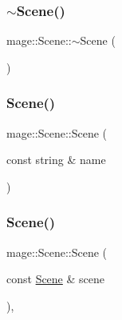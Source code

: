 \subsubsection{\texorpdfstring{$\sim$\+Scene()}{~Scene()}}
{\footnotesize\ttfamily mage\+::\+Scene\+::$\sim$\+Scene (\begin{DoxyParamCaption}{ }\end{DoxyParamCaption})\hspace{0.3cm}{\ttfamily [default]}}

\hypertarget{classmage_1_1_scene_aab61b38547fc53aa9c5b3b559f4d2e26}{}\label{classmage_1_1_scene_aab61b38547fc53aa9c5b3b559f4d2e26} 
\subsubsection{\texorpdfstring{Scene()}{Scene()}\hspace{0.1cm}{\footnotesize\ttfamily [1/3]}}
{\footnotesize\ttfamily mage\+::\+Scene\+::\+Scene (\begin{DoxyParamCaption}\item[{const string \&}]{name }\end{DoxyParamCaption})\hspace{0.3cm}{\ttfamily [protected]}}

\hypertarget{classmage_1_1_scene_a88d83ccb2e10549d5370f850b2b4c228}{}\label{classmage_1_1_scene_a88d83ccb2e10549d5370f850b2b4c228} 
\subsubsection{\texorpdfstring{Scene()}{Scene()}\hspace{0.1cm}{\footnotesize\ttfamily [2/3]}}
{\footnotesize\ttfamily mage\+::\+Scene\+::\+Scene (\begin{DoxyParamCaption}\item[{const \hyperlink{classmage_1_1_scene}{Scene} \&}]{scene }\end{DoxyParamCaption})\hspace{0.3cm}{\ttfamily [private]}, {\ttfamily [delete]}}

\hypertarget{classmage_1_1_scene_a084284387b472f4eaf421509ef267b34}{}\label{classmage_1_1_scene_a084284387b472f4eaf421509ef267b34} 
